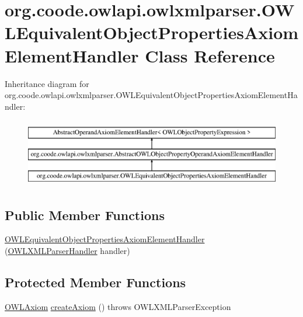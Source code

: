 \hypertarget{classorg_1_1coode_1_1owlapi_1_1owlxmlparser_1_1_o_w_l_equivalent_object_properties_axiom_element_handler}{\section{org.\-coode.\-owlapi.\-owlxmlparser.\-O\-W\-L\-Equivalent\-Object\-Properties\-Axiom\-Element\-Handler Class Reference}
\label{classorg_1_1coode_1_1owlapi_1_1owlxmlparser_1_1_o_w_l_equivalent_object_properties_axiom_element_handler}
}
Inheritance diagram for org.\-coode.\-owlapi.\-owlxmlparser.\-O\-W\-L\-Equivalent\-Object\-Properties\-Axiom\-Element\-Handler\-:\begin{figure}[H]
\begin{center}
\leavevmode
\includegraphics[height=3.000000cm]{classorg_1_1coode_1_1owlapi_1_1owlxmlparser_1_1_o_w_l_equivalent_object_properties_axiom_element_handler}
\end{center}
\end{figure}
\subsection*{Public Member Functions}
\begin{DoxyCompactItemize}
\item 
\hyperlink{classorg_1_1coode_1_1owlapi_1_1owlxmlparser_1_1_o_w_l_equivalent_object_properties_axiom_element_handler_a02e94de913f25a30e47971b1226b8909}{O\-W\-L\-Equivalent\-Object\-Properties\-Axiom\-Element\-Handler} (\hyperlink{classorg_1_1coode_1_1owlapi_1_1owlxmlparser_1_1_o_w_l_x_m_l_parser_handler}{O\-W\-L\-X\-M\-L\-Parser\-Handler} handler)
\end{DoxyCompactItemize}
\subsection*{Protected Member Functions}
\begin{DoxyCompactItemize}
\item 
\hyperlink{interfaceorg_1_1semanticweb_1_1owlapi_1_1model_1_1_o_w_l_axiom}{O\-W\-L\-Axiom} \hyperlink{classorg_1_1coode_1_1owlapi_1_1owlxmlparser_1_1_o_w_l_equivalent_object_properties_axiom_element_handler_aea57e1be8628c8f0664e642e3b21be7e}{create\-Axiom} ()  throws O\-W\-L\-X\-M\-L\-Parser\-Exception 
\end{DoxyCompactItemize}


